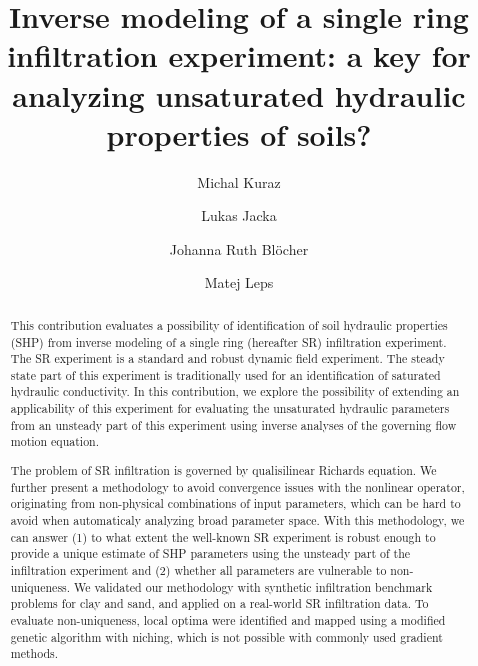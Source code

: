 \documentclass[review,times,3p,10pt]{elsarticle}
\begin{document}
\begin{frontmatter}

\title{Inverse modeling of a single ring infiltration experiment: a key for analyzing unsaturated hydraulic properties of soils?}

\author[autor1]{Michal Kuraz}

\author[autor1]{Lukas Jacka}

\author[autor1]{Johanna Ruth Bl\"ocher}

\author[autor2]{Matej Leps}



\address[autor1]{Czech University of Life Sciences Prague, Faculty of Environmental Sciences, Department of Water Resources and Environmental Modeling}

\address[autor2]{Czech Technical University in Prague, Faculty of Civil Engineering, Department of Mechanics}

\begin{abstract}
This contribution evaluates a possibility of identification of soil hydraulic properties (SHP) from inverse modeling of a single ring (hereafter SR) infiltration experiment. The SR experiment is a standard and robust  dynamic field experiment. The steady state part of this experiment is traditionally used for an identification of saturated hydraulic conductivity. In this contribution, we explore the possibility of extending an applicability of this experiment for evaluating the unsaturated hydraulic parameters from an unsteady part of this experiment using inverse analyses of the governing flow motion equation.



The problem of SR infiltration is governed by qualisilinear Richards equation.
We further present a methodology to avoid convergence issues with the nonlinear operator, originating from non-physical combinations of input parameters, which can be hard to avoid when automaticaly analyzing broad parameter space.  With this methodology, we can answer (1) to what extent the well-known SR experiment is robust enough to provide a unique estimate of SHP parameters using the unsteady part of the infiltration experiment and (2) whether all parameters are vulnerable to non-uniqueness. We validated our methodology with synthetic infiltration benchmark problems for clay and sand, and applied on a real-world SR infiltration data. To evaluate non-uniqueness, local optima were identified and mapped using a modified genetic algorithm with niching, which is not possible with commonly used gradient methods. 


\end{abstract}
\end{frontmatter}
\end{document}
